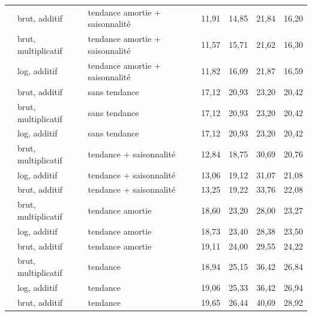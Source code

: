 \begin{tabular}{lllrrrr}
 & brut, additif & tendance amortie + saisonnalité & 11,91 & 14,85 & 21,84 & 16,20 \\
 & brut, multiplicatif & tendance amortie + saisonnalité & 11,57 & 15,71 & 21,62 & 16,30 \\
 & log, additif & tendance amortie + saisonnalité & 11,82 & 16,09 & 21,87 & 16,59 \\
 & brut, additif & sans tendance & 17,12 & 20,93 & 23,20 & 20,42 \\
 & brut, multiplicatif & sans tendance & 17,12 & 20,93 & 23,20 & 20,42 \\
 & log, additif & sans tendance & 17,12 & 20,93 & 23,20 & 20,42 \\
 & brut, multiplicatif & tendance + saisonnalité & 12,84 & 18,75 & 30,69 & 20,76 \\
 & log, additif & tendance + saisonnalité & 13,06 & 19,12 & 31,07 & 21,08 \\
 & brut, additif & tendance + saisonnalité & 13,25 & 19,22 & 33,76 & 22,08 \\
 & brut, multiplicatif & tendance amortie & 18,60 & 23,20 & 28,00 & 23,27 \\
 & log, additif & tendance amortie & 18,73 & 23,40 & 28,38 & 23,50 \\
 & brut, additif & tendance amortie & 19,11 & 24,00 & 29,55 & 24,22 \\
 & brut, multiplicatif & tendance & 18,94 & 25,15 & 36,42 & 26,84 \\
 & log, additif & tendance & 19,06 & 25,33 & 36,42 & 26,94 \\
 & brut, additif & tendance & 19,65 & 26,44 & 40,69 & 28,92 \\
\bottomrule
\end{tabular}
